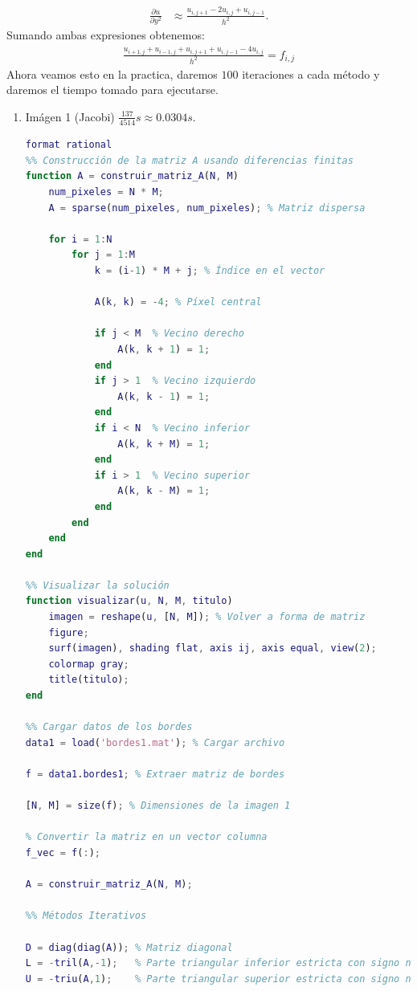 \begin{homeworkProblem}
\begin{solucion}
\begin{align*}
      \frac{\partial u}{\partial y^2}&\approx \frac{u_{i,j+1}-2u_{i,j}+u_{i,j-1}}{h^2}.
    \end{align*}
    Sumando ambas expresiones obtenemos:
    \begin{align*}
      \frac{u_{i+1,j}+u_{i-1,j}+u_{i,j+1}+u_{i,j-1}-4u_{i,j}}{h^2}=f_{i,j}
    \end{align*}
    Ahora veamos esto en la practica, daremos $100$ iteraciones a cada método y daremos el tiempo tomado para ejecutarse. 
    \newpage
    \begin{enumerate}
      \item Imágen 1 (Jacobi) $\frac{137}{4514}s\approx 0.0304 s$.
        \begin{lstlisting}[language = matlab]
format rational
%% Construcción de la matriz A usando diferencias finitas
function A = construir_matriz_A(N, M)
    num_pixeles = N * M;
    A = sparse(num_pixeles, num_pixeles); % Matriz dispersa

    for i = 1:N
        for j = 1:M
            k = (i-1) * M + j; % Índice en el vector

            A(k, k) = -4; % Píxel central

            if j < M  % Vecino derecho
                A(k, k + 1) = 1;
            end
            if j > 1  % Vecino izquierdo
                A(k, k - 1) = 1;
            end
            if i < N  % Vecino inferior
                A(k, k + M) = 1;
            end
            if i > 1  % Vecino superior
                A(k, k - M) = 1;
            end
        end
    end
end

%% Visualizar la solución
function visualizar(u, N, M, titulo)
    imagen = reshape(u, [N, M]); % Volver a forma de matriz
    figure;
    surf(imagen), shading flat, axis ij, axis equal, view(2);
    colormap gray;
    title(titulo);
end

%% Cargar datos de los bordes
data1 = load('bordes1.mat'); % Cargar archivo

f = data1.bordes1; % Extraer matriz de bordes

[N, M] = size(f); % Dimensiones de la imagen 1

% Convertir la matriz en un vector columna
f_vec = f(:);

A = construir_matriz_A(N, M);

%% Métodos Iterativos

D = diag(diag(A)); % Matriz diagonal
L = -tril(A,-1);   % Parte triangular inferior estricta con signo negativo
U = -triu(A,1);    % Parte triangular superior estricta con signo negativo


\end{lstlisting}
\end{enumerate}
\end{solucion}
\end{homeworkProblem}
